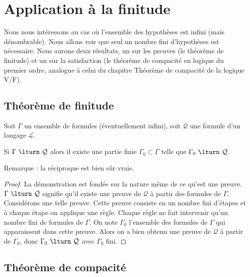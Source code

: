 \documentclass[11pt,class=report,crop=false]{standalone}
\begin{document}
\section{Application à la finitude}

Nous nous intéressons au cas où l'ensemble des hypothèses est infini (mais dénombrable).
Nous allons voir que seul un nombre fini d'hypothèses est nécessaire.
Nous aurons deux résultats, un sur les preuves (le théorème de finitude) et un sur la satisfaction (le théorème de compacité en logique du premier ordre, analogue à celui du chapitre \og{}Théorème de compacité\fg{} de la logique V/F).


\subsection{Théorème de finitude}

Soit $\Gamma$ un ensemble de formules (éventuellement infini), soit $\mathcal{Q}$ une formule d'un langage $\mathcal{L}$.

\begin{theoreme}
	Si $\Gamma \ \lturn \ \mathcal{Q}$ alors il existe une partie finie $\Gamma_0 \subset \Gamma$ telle que $\Gamma_0 \ \lturn \ \mathcal{Q}$.
\end{theoreme}


Remarque : la réciproque est bien sûr vraie.

\begin{proof}
La démonstration est fondée sur la nature même de ce qu'est une preuve.
$\Gamma \ \lturn \ \mathcal{Q}$ signifie qu'il existe une preuve de $\mathcal{Q}$ à partir des formules de $\Gamma$. Considérons une telle preuve.
Cette preuve consiste en un nombre fini d'étapes et à chaque étape on applique une règle. Chaque règle ne fait intervenir qu'un nombre fini de formules de $\Gamma$.
On note $\Gamma_0$ l'ensemble des formules de $\Gamma$ qui apparaissent dans cette preuve. Alors on a bien obtenu une preuve de $\mathcal{Q}$ à partir de $\Gamma_0$, donc $\Gamma_0 \ \lturn \ \mathcal{Q}$ avec $\Gamma_0$ fini.	
\end{proof}

\subsection{Théorème de compacité}
\end{document}
